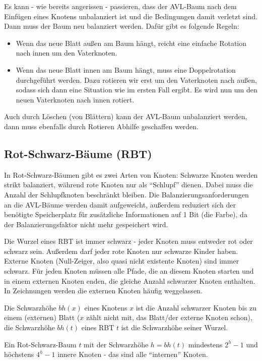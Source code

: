 \documentclass[12pt]{article}
\begin{document}
Es kann - wie bereits angerissen - passieren, dass der AVL-Baum nach dem Einfügen eines Knotens unbalanziert ist und die Bedingungen damit verletzt sind. Dann muss der  Baum neu balanziert werden. Dafür gibt es folgende Regeln:

\begin{itemize}  
\item Wenn das neue Blatt außen am Baum hängt, reicht eine einfache Rotation nach innen um den Vaterknoten.
\item Wenn das neue Blatt innen am Baum hängt, muss eine Doppelrotation durchgeführt werden. Dazu rotieren wir erst um den Vaterknoten nach außen, sodass sich dann eine Situation wie im ersten Fall ergibt. Es wird nun um den neuen Vaterknoten nach innen rotiert.
\end{itemize}

Auch durch Löschen (von Blättern) kann der AVL-Baum unbalanziert werden, dann muss ebenfalls durch Rotieren Abhilfe geschaffen werden.

\subsection{Rot-Schwarz-Bäume (RBT)}

In Rot-Schwarz-Bäumen gibt es zwei Arten von Knoten: Schwarze Knoten werden strikt balanziert, während rote Knoten nur als \enquote{Schlupf} dienen. Dabei muss die Anzahl der Schlupfknoten beschränkt bleiben. Die Balanzierungsanforderungen an die AVL-Bäume werden damit aufgeweicht, außerdem reduziert sich der benötigte Speicherplatz für zusätzliche Informationen auf 1 Bit (die Farbe), da der Balanzierungsfaktor nicht mehr gespeichert wird.

Die Wurzel eines RBT ist immer schwarz - jeder Knoten muss entweder rot oder schwarz sein. Außerdem darf jeder rote Knoten nur schwarze Kinder haben. Externe Knoten (Null-Zeiger, also quasi nicht existente Knoten) sind immer schwarz. Für jeden Knoten müssen alle Pfade, die an diesem Knoten starten und in einem externen Knoten enden, die gleiche Anzahl schwarzer Knoten enthalten. In Zeichnungen werden die externen Knoten häufig weggelassen.

Die Schwarzhöhe $bh(x)$ eines Knotens $x$ ist die Anzahl schwarzer Knoten bis zu einem (externen) Blatt ($x$ zählt nicht mit, das Blatt/der externe Knoten schon), die Schwarzhöhe $bh(t)$ eines RBT $t$ ist die Schwarzhöhe seiner Wurzel.

Ein Rot-Schwarz-Baum $t$ mit der Schwarzhöhe $h = bh(t)$ mindestens $2^h-1$ und höchstens $4^h-1$ innere Knoten - das sind alle \enquote{internen} Knoten.
\end{document}
